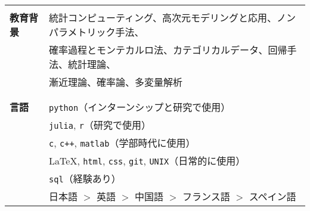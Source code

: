 \documentclass[utf8,letterpaper,oneside]{article}
\begin{document}
\begin{center}
\begin{tabular}{l l}
                      &                                                                                                \\
  \textbf{教育背景}   & 統計コンピューティング、高次元モデリングと応用、ノンパラメトリック手法、                       \\
                      & 確率過程とモンテカルロ法、カテゴリカルデータ、回帰手法、統計理論、                             \\
                      & 漸近理論、確率論、多変量解析                                                                   \\
                      &                                                                                                \\ \hline
                      &                                                                                                \\
  \textbf{言語}       & \texttt{python}（インターンシップと研究で使用）                                           \\
                      & \texttt{julia}, \texttt{r}（研究で使用）                                                  \\
                      & \texttt{c}, \texttt{c++}, \texttt{matlab}（学部時代に使用）                               \\
                      & \LaTeX, \texttt{html}, \texttt{css}, \texttt{git}, \texttt{UNIX}（日常的に使用）          \\
                      & \texttt{sql}（経験あり）                                                                  \\
                      & 日本語 $>$ 英語 $>$ 中国語 $>$ フランス語 $>$ スペイン語                                       \\
 \end{tabular}
\end{center}
\end{document}
